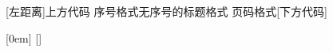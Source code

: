 [左距离]{上方代码}
{序号格式}{无序号的标题格式}
{页码格式}[下方代码]

[0em]
{\vspace{1em}\Large\tocchapterfont}
{\makebox[10mm][l]{\S\hspace{0.1em}\large\uppercase\expandafter{\romannumeral\thecontentslabel}}}
{}
{\hspace{4mm}\tocpagefont\large\contentspage}
[\vspace{0.5em}]